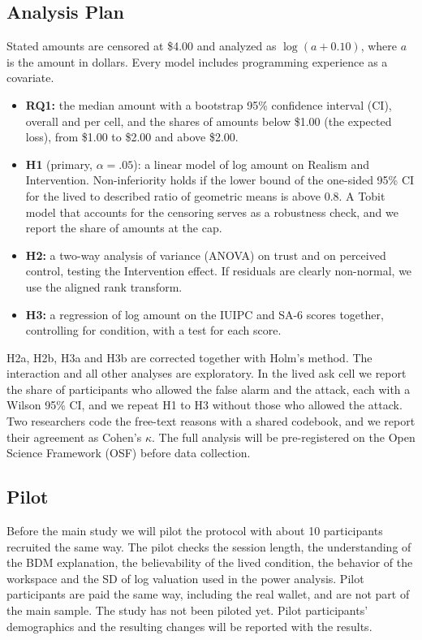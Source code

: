 \documentclass[sigconf,nonacm]{acmart}
\begin{document}
\subsection{Analysis Plan}
Stated amounts are censored at \$4.00 and analyzed as $\log(a+0.10)$, where $a$ is the amount in dollars. Every model includes programming experience as a covariate.
\begin{itemize}
\item \textbf{RQ1:} the median amount with a bootstrap 95\% confidence interval (CI), overall and per cell, and the shares of amounts below \$1.00 (the expected loss), from \$1.00 to \$2.00 and above \$2.00.
\item \textbf{H1} (primary, $\alpha=.05$): a linear model of log amount on Realism and Intervention. Non-inferiority holds if the lower bound of the one-sided 95\% CI for the lived to described ratio of geometric means is above 0.8. A Tobit model that accounts for the censoring serves as a robustness check, and we report the share of amounts at the cap.
\item \textbf{H2:} a two-way analysis of variance (ANOVA) on trust and on perceived control, testing the Intervention effect. If residuals are clearly non-normal, we use the aligned rank transform.
\item \textbf{H3:} a regression of log amount on the IUIPC and SA-6 scores together, controlling for condition, with a test for each score.
\end{itemize}
H2a, H2b, H3a and H3b are corrected together with Holm's method. The interaction and all other analyses are exploratory. In the lived ask cell we report the share of participants who allowed the false alarm and the attack, each with a Wilson 95\% CI, and we repeat H1 to H3 without those who allowed the attack. Two researchers code the free-text reasons with a shared codebook, and we report their agreement as Cohen's $\kappa$. The full analysis will be pre-registered on the Open Science Framework (OSF) before data collection.

\subsection{Pilot}
Before the main study we will pilot the protocol with about 10 participants recruited the same way. The pilot checks the session length, the understanding of the BDM explanation, the believability of the lived condition, the behavior of the workspace and the SD of log valuation used in the power analysis. Pilot participants are paid the same way, including the real wallet, and are not part of the main sample. The study has not been piloted yet. Pilot participants' demographics and the resulting changes will be reported with the results.
\end{document}

